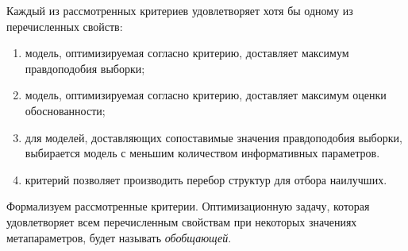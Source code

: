 Каждый из рассмотренных критериев удовлетворяет хотя бы одному из перечисленных свойств:
\begin{enumerate}[label={\arabic*)}]
\item модель, оптимизируемая согласно критерию, доставляет максимум правдоподобия выборки;
\item модель, оптимизируемая согласно критерию, доставляет максимум оценки обоснованности;
\item для моделей, доставляющих сопоставимые значения правдоподобия выборки, выбирается модель с меньшим количеством информативных параметров.
\item критерий позволяет производить перебор структур для отбора наилучших.
\end{enumerate}

Формализуем рассмотренные критерии. Оптимизационную задачу, которая удовлетворяет всем перечисленным свойствам при некоторых значениях метапараметров, будет называть \textit{обобщающей}.

